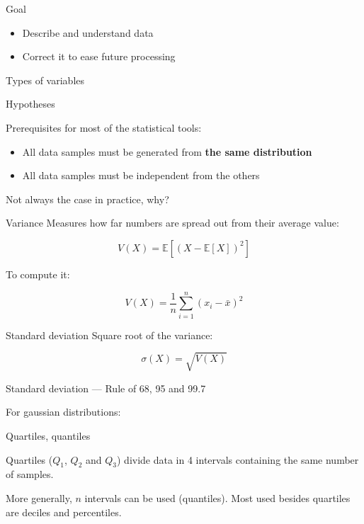 
\begin{frame}{Goal}
  \begin{itemize}
  \item Describe and understand data
  \item Correct it to ease future processing
  \end{itemize}
\end{frame}

\begin{frame}{Types of variables}
\end{frame}

\begin{frame}{Hypotheses}

  Prerequisites for most of the statistical tools:
  \begin{itemize}
  \item All data samples must be generated from \textbf{the same distribution}
  \item All data samples must be independent from the others
  \end{itemize}
  \alert{Not always the case in practice, why?}
\end{frame}

\begin{frame}{Variance}
  Measures how far numbers are spread out from their average value:

  \[
    V(X) = \mathbb{E}\left[(X - \mathbb{E}[X])^2\right]
  \]

  To compute it:

  \[
    V(X) = \frac{1}{n}\sum_{i = 1}^{n}(x_i - \bar{x})^2
  \]
\end{frame}

\begin{frame}{Standard deviation}
  Square root of the variance:

  \[
    \sigma(X) = \sqrt{V(X)}
  \]

\end{frame}

\begin{frame}{Standard deviation — Rule of 68, 95 and 99.7}

  For gaussian distributions:

\end{frame}

\begin{frame}{Quartiles, quantiles}

  Quartiles ($Q_1$, $Q_2$ and $Q_3$) divide data in 4
  intervals containing the same number of samples.

  More generally, $n$ intervals can be used (quantiles). Most used besides quartiles are deciles and percentiles.
\end{frame}

